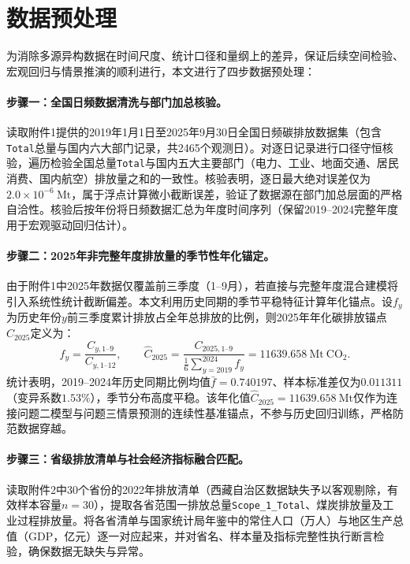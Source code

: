 \documentclass[12pt,a4paper]{ctexart}
\theoremstyle{definition}
\theoremstyle{plain}
\theoremstyle{remark}
\begin{document}
\section{数据预处理}

为消除多源异构数据在时间尺度、统计口径和量纲上的差异，保证后续空间检验、宏观回归与情景推演的顺利进行，本文进行了四步数据预处理：

\paragraph{\textbf{步骤一：全国日频数据清洗与部门加总核验。}}
读取附件1提供的2019年1月1日至2025年9月30日全国日频碳排放数据集（包含\texttt{Total}总量与国内六大部门记录，共2465个观测日）。对逐日记录进行口径守恒核验，遍历检验全国总量\texttt{Total}与国内五大主要部门（电力、工业、地面交通、居民消费、国内航空）排放量之和的一致性。核验表明，逐日最大绝对误差仅为$2.0\times10^{-6}\ \mathrm{Mt}$，属于浮点计算微小截断误差，验证了数据源在部门加总层面的严格自洽性。核验后按年份将日频数据汇总为年度时间序列（保留2019--2024完整年度用于宏观驱动回归估计）。

\paragraph{\textbf{步骤二：2025年非完整年度排放量的季节性年化锚定。}}
由于附件1中2025年数据仅覆盖前三季度（1--9月），若直接与完整年度混合建模将引入系统性统计截断偏差。本文利用历史同期的季节平稳特征计算年化锚点。设$f_y$为历史年份$y$前三季度累计排放占全年总排放的比例，则2025年年化碳排放锚点$\widehat C_{2025}$定义为：
\begin{equation}
f_y=\frac{C_{y,1\text{--}9}}{C_{y,1\text{--}12}},\qquad
\widehat C_{2025}=\frac{C_{2025,1\text{--}9}}{\frac{1}{6}\sum_{y=2019}^{2024}f_y}=11639.658\ \mathrm{Mt\ CO_2}.
\label{eq:annualize}
\end{equation}
统计表明，2019--2024年历史同期比例均值$\bar f=0.740197$、样本标准差仅为$0.011311$（变异系数$1.53\%$），季节分布高度平稳。该年化值$\widehat C_{2025}=11639.658\ \mathrm{Mt}$仅作为连接问题二模型与问题三情景预测的连续性基准锚点，不参与历史回归训练，严格防范数据穿越。

\paragraph{\textbf{步骤三：省级排放清单与社会经济指标融合匹配。}}
读取附件2中30个省份的2022年排放清单（西藏自治区数据缺失予以客观剔除，有效样本容量$n=30$），提取各省范围一排放总量\texttt{Scope\_1\_Total}、煤炭排放量及工业过程排放量。将各省清单与国家统计局年鉴中的常住人口（万人）与地区生产总值（GDP，亿元）逐一对应起来，并对省名、样本量及指标完整性执行断言检验，确保数据无缺失与异常。
\end{document}
